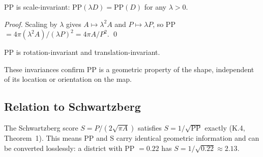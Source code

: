 \begin{proposition}
  PP is scale-invariant: $\text{PP}(\lambda D) = \text{PP}(D)$ for any $\lambda > 0$.
\end{proposition}

\begin{proof}
  Scaling by $\lambda$ gives $A \mapsto \lambda^2 A$ and $P \mapsto \lambda P$,
  so PP $= 4\pi(\lambda^2 A)/(\lambda P)^2 = 4\pi A/P^2$. \qed
\end{proof}

\begin{proposition}
  PP is rotation-invariant and translation-invariant.
\end{proposition}

These invariances confirm PP is a geometric property of the shape,
independent of its location or orientation on the map.

\subsection{Relation to Schwartzberg}

The Schwartzberg score $S = P/(2\sqrt{\pi A})$ satisfies $S = 1/\sqrt{\text{PP}}$
exactly (K.4, Theorem~1). This means PP and S carry identical geometric information
and can be converted losslessly: a district with PP $= 0.22$ has
$S = 1/\sqrt{0.22} \approx 2.13$.
